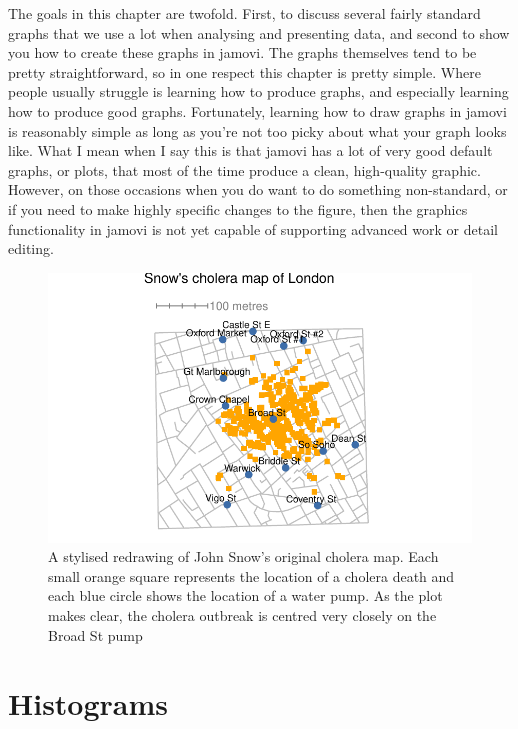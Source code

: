 \documentclass[
  letterpaper,
]{book}
\begin{document}
The goals in this chapter are twofold. First, to discuss several fairly
standard graphs that we use a lot when analysing and presenting data,
and second to show you how to create these graphs in jamovi. The graphs
themselves tend to be pretty straightforward, so in one respect this
chapter is pretty simple. Where people usually struggle is learning how
to produce graphs, and especially learning how to produce good graphs.
Fortunately, learning how to draw graphs in jamovi is reasonably simple
as long as you're not too picky about what your graph looks like. What I
mean when I say this is that jamovi has a lot of very good default
graphs, or plots, that most of the time produce a clean, high-quality
graphic. However, on those occasions when you do want to do something
non-standard, or if you need to make highly specific changes to the
figure, then the graphics functionality in jamovi is not yet capable of
supporting advanced work or detail editing.

\begin{figure}

\includegraphics[width=1\textwidth,height=\textheight]{./05-Drawing-graphs_files/figure-pdf/fig-fig5-1-1.pdf} \hfill{}

\caption{\label{fig-fig5-1}A stylised redrawing of John Snow's original
cholera map. Each small orange square represents the location of a
cholera death and each blue circle shows the location of a water pump.
As the plot makes clear, the cholera outbreak is centred very closely on
the Broad St pump}

\end{figure}

\hypertarget{sec-Histograms}{%
\section{Histograms}\label{sec-Histograms}}
\end{document}

